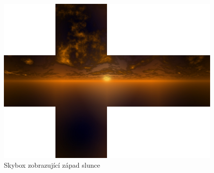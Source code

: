 \begin{figure}[h]
\centering
\includegraphics[width=15cm,keepaspectratio]{obr/skybox1.jpg}
\caption{Skybox zobrazující západ slunce}
\label{fig:skybox1}
\end{figure}






